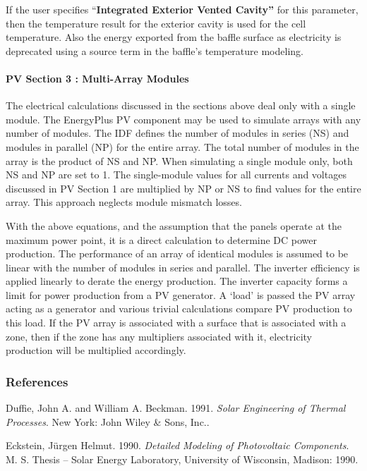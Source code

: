 If the user specifies ``\textbf{Integrated Exterior Vented Cavity''} for this parameter, then the temperature result for the exterior cavity is used for the cell temperature. Also the energy exported from the baffle surface as electricity is deprecated using a source term in the baffle's temperature modeling.

\paragraph{PV Section 3 : Multi-Array Modules}\label{pv-section-3-multi-array-modules}

The electrical calculations discussed in the sections above deal only with a single module. The EnergyPlus PV component may be used to simulate arrays with any number of modules. The IDF defines the number of modules in series (NS) and modules in parallel (NP) for the entire array. The total number of modules in the array is the product of NS and NP. When simulating a single module only, both NS and NP are set to 1. The single-module values for all currents and voltages discussed in PV Section 1 are multiplied by NP or NS to find values for the entire array. This approach neglects module mismatch losses.

With the above equations, and the assumption that the panels operate at the maximum power point, it is a direct calculation to determine DC power production. The performance of an array of identical modules is assumed to be linear with the number of modules in series and parallel. The inverter efficiency is applied linearly to derate the energy production. The inverter capacity forms a limit for power production from a PV generator. A `load' is passed the PV array acting as a generator and various trivial calculations compare PV production to this load. If the PV array is associated with a surface that is associated with a zone, then if the zone has any multipliers associated with it, electricity production will be multiplied accordingly.

\subsubsection{References}\label{references-035}

Duffie, John A. and William A. Beckman. 1991. \emph{Solar Engineering of Thermal Processes}. New York: John Wiley \& Sons, Inc..

Eckstein, Jürgen Helmut. 1990. \emph{Detailed Modeling of Photovoltaic Components}. M. S. Thesis -- Solar Energy Laboratory, University of Wisconsin, Madison: 1990.

